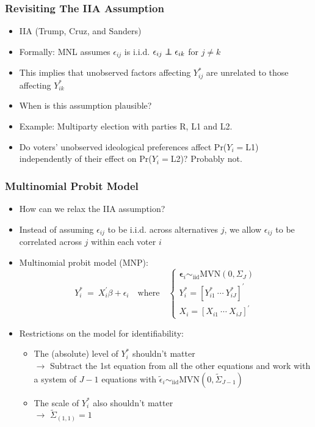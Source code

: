 \documentclass{beamer}
\newcommand\indep{\protect\mathpalette{\protect\independenT}{\perp}}
\def\independenT#1#2{\mathrel{\rlap{$#1#2$}\mkern2mu{#1#2}}}
\begin{document}
\begin{frame}
\frametitle{Revisiting The IIA Assumption}
\begin{itemize}
  \item IIA (Trump, Cruz, and Sanders)
\medskip
\pause
  \item Formally: MNL assumes $\epsilon_{ij}$ is i.i.d.  $\epsilon_{ij} \indep \epsilon_{ik}$ for $j\neq k$
\medskip
\pause
  \item This implies that unobserved factors affecting $Y_{ij}^\ast$
    are unrelated to those affecting $Y_{ik}^\ast$
\medskip
\pause
  \item When is this assumption plausible?
\pause
\bigskip
  \item Example: Multiparty election with parties R, L1 and L2.
\medskip
\pause
  \item Do voters' unobserved ideological preferences affect Pr($Y_i=$L1) independently
    of their effect on Pr($Y_i=$L2)? \pause Probably not.
\end{itemize}
\end{frame}



\begin{frame}
\frametitle{Multinomial Probit Model}
\begin{itemize}
 \item How can we relax the IIA assumption?
\medskip
\pause
  \item Instead of assuming $\epsilon_{ij}$ to be i.i.d. across alternatives $j$,
    we allow $\epsilon_{ij}$ to be correlated across $j$
    within each voter $i$
\medskip
\pause
 \item \alert{Multinomial probit model (MNP)}: \\
   $$ Y_i^\ast \ = \ X_i^{'} \beta + \epsilon_i \quad \text{where}
   \quad \left\{ \begin{array}{l} \boldsymbol{\epsilon}_i \sim_{\text{iid}} \text{MVN}(0, \Sigma_{J}) \\
         Y_i^\ast = [Y_{i1}^\ast \ \cdots \ Y_{iJ}^\ast]^{'} \\
         X_i = \left[ X_{i1} \ \cdots \ X_{iJ}\right]^{'} \end{array}\right. $$

\medskip
\pause
  \item Restrictions on the model for identifiability:
\pause
    \begin{itemize}
      \item The (absolute) \alert{level} of $Y_i^\ast$ shouldn't matter \\ \pause
      $\longrightarrow$ Subtract the 1st equation from
       all the other equations and work with a system of $J-1$
       equations with $\tilde\epsilon_i \sim_{\text{iid}} \text{MVN} (0, \tilde\Sigma_{J-1})$
\pause
      \item The \alert{scale} of $Y_i^\ast$ also shouldn't matter \\ \pause
      $\longrightarrow$ $\tilde\Sigma_{(1,1)} = 1$
    \end{itemize}
\end{itemize}
\end{frame}
\end{document}
